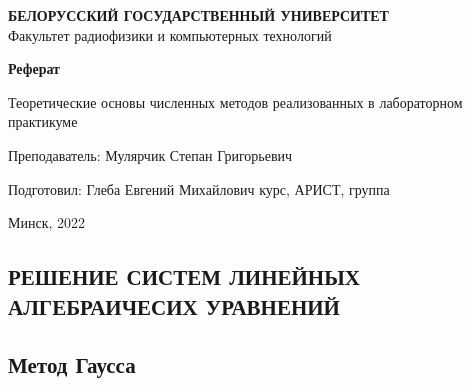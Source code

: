 \documentclass[a4paper]{article}
\begin{document}
%
%

\begin{titlepage}

\begin{center}
\large \textbf{ БЕЛОРУССКИЙ ГОСУДАРСТВЕННЫЙ УНИВЕРСИТЕТ }\\
Факультет радиофизики и компьютерных технологий
\end{center}

\vspace{8em}

\Large
\huge
\begin{center}
\textbf{Реферат}
\end{center}

\Large
\begin{center}
Теоретические основы численных методов реализованных в лабораторном практикуме
\end{center}

\vspace{10em}


\hfill \parbox{10em}{
    Преподаватель:\newline
    Мулярчик Степан Григорьевич\newline

    Подготовил:\newline
    Глеба Евгений Михайлович курс, АРИСТ, группа
}



\vspace{\fill}

\begin{center}
Минск, 2022
\end{center}

\end{titlepage}

\setcounter{page}{2}


\tableofcontents

\newpage

\begin{center}
    \item \section{ РЕШЕНИЕ СИСТЕМ ЛИНЕЙНЫХ АЛГЕБРАИЧЕСИХ УРАВНЕНИЙ }
\end{center}

\subsection{Метод Гаусса}
\end{document}

